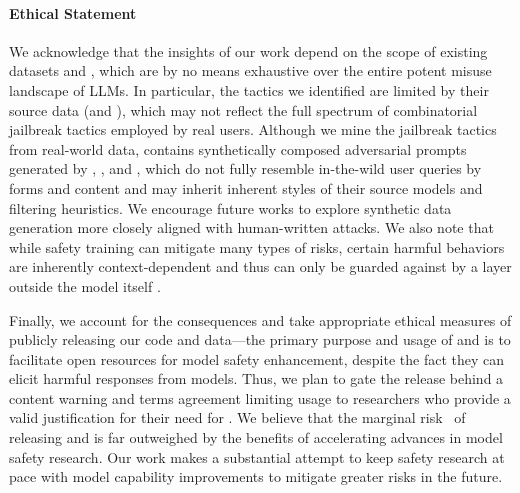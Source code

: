 \paragraph{Ethical Statement}

We acknowledge that the insights of our work depend on the scope of existing datasets and \dataset, which are by no means exhaustive over the entire potent misuse landscape of LLMs. In particular, the tactics we identified are limited by their source data (\lmsysshort and \wildchatshort), which may not reflect the full spectrum of combinatorial jailbreak tactics employed by real users. Although we mine the jailbreak tactics from real-world data, \dataset contains synthetically composed adversarial prompts generated by \mixtral, \chatgpt, and \gptfour, which do not fully resemble in-the-wild user queries by forms and content and may inherit inherent styles of their source models and filtering heuristics. We encourage future works to explore synthetic data generation more closely aligned with human-written attacks. We also note that while safety training can mitigate many types of risks, certain harmful behaviors are inherently context-dependent and thus can only be guarded against by a layer outside the model itself \cite{ai-safety-not-a-model-property}. 

Finally, we account for the consequences and take appropriate ethical measures of publicly releasing our code and data---the primary purpose and usage of \method and \dataset is to facilitate open resources for model safety enhancement, despite the fact they can elicit harmful responses from models. Thus, we plan to gate the \dataset release behind a content warning and terms agreement limiting usage to researchers who provide a valid justification for their need for \dataset. We believe that the marginal risk~\citet{kapoor2024societal-impact-foundation-models} of releasing \method and \dataset is far outweighed by the benefits of accelerating advances in model safety research. Our work makes a substantial attempt to keep safety research at pace with model capability improvements to mitigate greater risks in the future.

